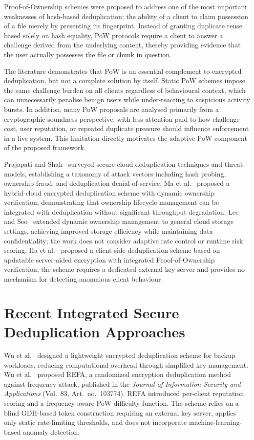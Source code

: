 \documentclass[12pt,a4paper,oneside]{report}
\begin{document}
Proof-of-Ownership schemes were proposed to address one of the most important weaknesses of hash-based deduplication: the ability of a client to claim possession of a file merely by presenting its fingerprint.
Instead of granting duplicate reuse based solely on hash equality, PoW protocols require a client to answer a challenge derived from the underlying content, thereby providing evidence that the user actually possesses the file or chunk in question.

The literature demonstrates that PoW is an essential complement to encrypted deduplication, but not a complete solution by itself.
Static PoW schemes impose the same challenge burden on all clients regardless of behavioural context, which can unnecessarily penalise benign users while under-reacting to suspicious activity bursts.
In addition, many PoW proposals are analysed primarily from a cryptographic soundness perspective, with less attention paid to how challenge cost, user reputation, or repeated duplicate pressure should influence enforcement in a live system.
This limitation directly motivates the adaptive PoW component of the proposed framework.

Prajapati and Shah~\cite{prajapati2022} surveyed secure cloud deduplication techniques and threat models, establishing a taxonomy of attack vectors including hash probing, ownership fraud, and deduplication denial-of-service.
Ma et al.~\cite{ma2022} proposed a hybrid-cloud encrypted deduplication scheme with dynamic ownership verification, demonstrating that ownership lifecycle management can be integrated with deduplication without significant throughput degradation.
Lee and Seo~\cite{lee2023} extended dynamic ownership management to general cloud storage settings, achieving improved storage efficiency while maintaining data confidentiality; the work does not consider adaptive rate control or runtime risk scoring.
Ha et al.~\cite{ha2023} proposed a client-side deduplication scheme based on updatable server-aided encryption with integrated Proof-of-Ownership verification; the scheme requires a dedicated external key server and provides no mechanism for detecting anomalous client behaviour.

\section{Recent Integrated Secure Deduplication Approaches}

Wu et al.~\cite{wu2023lightweight} designed a lightweight encrypted deduplication scheme for backup workloads, reducing computational overhead through simplified key management.
Wu et al.~\cite{wu2024refa} proposed REFA, a randomized encryption deduplication method against frequency attack, published in the \textit{Journal of Information Security and Applications} (Vol.~83, Art.~no.~103774).
REFA introduced per-client reputation scoring and a frequency-aware PoW difficulty function.
The scheme relies on a blind GDH-based token construction requiring an external key server, applies only static rate-limiting thresholds, and does not incorporate machine-learning-based anomaly detection.
\end{document}
